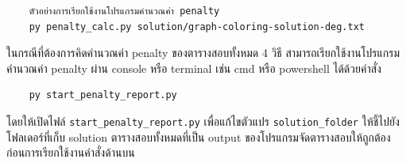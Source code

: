\begin{verbatim}
    ตัวอย่างการเรียกใช้งานโปรแกรมคำนวณค่า penalty
    py penalty_calc.py solution/graph-coloring-solution-deg.txt
\end{verbatim}

\noindent ในกรณีที่ต้องการคิดคำนวณค่า penalty ของตารางสอบทั้งหมด 4 วิธี สามารถเรียกใช้งานโปรแกรมคำนวณค่า penalty ผ่าน console หรือ terminal เช่น cmd หรือ powershell ได้ด้วยคำสั่ง
\begin{verbatim}
    py start_penalty_report.py
\end{verbatim}
โดยให้เปิดไฟล์ \verb+start_penalty_report.py+ เพื่อแก้ไขตัวแปร \verb+solution_folder+ ให้ชี้ไปยังโฟลเดอร์ที่เก็บ solution ตารางสอบทั้งหมดที่เป็น output ของโปรแกรมจัดตารางสอบให้ถูกต้องก่อนการเรียกใช้งานคำสั่งด้านบน